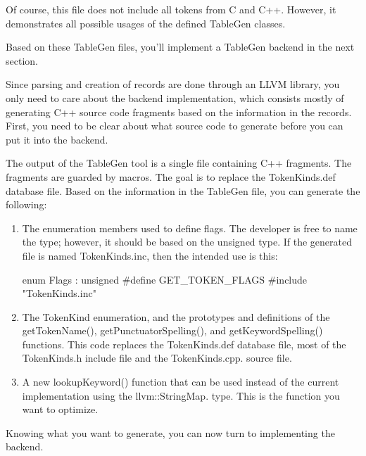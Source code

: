 Of course, this file does not include all tokens from C and C++. However, it demonstrates all possible usages of the defined TableGen classes.

Based on these TableGen files, you’ll implement a TableGen backend in the next section.


Since parsing and creation of records are done through an LLVM library, you only need to care about the backend implementation, which consists mostly of generating C++ source code fragments based on the information in the records. First, you need to be clear about what source code to generate before you can put it into the backend.


The output of the TableGen tool is a single file containing C++ fragments. The fragments are guarded by macros. The goal is to replace the TokenKinds.def database file. Based on the information in the TableGen file, you can generate the following:

\begin{enumerate}
\item
The enumeration members used to define flags. The developer is free to name the type; however, it should be based on the unsigned type. If the generated file is named TokenKinds.inc, then the intended use is this:

\begin{cpp}
enum Flags : unsigned {
    #define GET_TOKEN_FLAGS
    #include "TokenKinds.inc"
}
\end{cpp}

\item
The TokenKind enumeration, and the prototypes and definitions of the getTokenName(), getPunctuatorSpelling(), and getKeywordSpelling() functions. This code replaces the TokenKinds.def database file, most of the TokenKinds.h include file and the TokenKinds.cpp. source file.

\item
A new lookupKeyword() function that can be used instead of the current implementation using the llvm::StringMap. type. This is the function you want to optimize.
\end{enumerate}

Knowing what you want to generate, you can now turn to implementing the backend.


